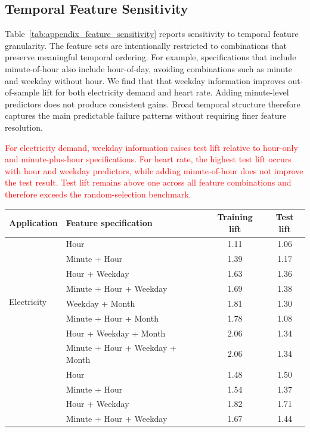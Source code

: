\documentclass[]{interact}
\newcommand{\matt}[1]{\textcolor{red}{#1}}
\newcommand{\spacingset}[1]{}
\theoremstyle{definition}
\begin{document}
\subsection{Temporal Feature Sensitivity}

Table~\ref{tab:appendix_feature_sensitivity} reports sensitivity to temporal feature granularity. The feature sets are intentionally restricted to combinations that preserve meaningful temporal ordering. For example, specifications that include minute-of-hour also include hour-of-day, avoiding combinations such as minute and weekday without hour. We find that that weekday information improves out-of-sample lift for both electricity demand and heart rate. Adding minute-level predictors does not produce consistent gains. Broad temporal structure therefore captures the main predictable failure patterns without requiring finer feature resolution.

\matt{For electricity demand, weekday information raises test lift relative to hour-only and minute-plus-hour specifications. For heart rate, the highest test lift occurs with hour and weekday predictors, while adding minute-of-hour does not improve the test result. Test lift remains above one across all feature combinations and therefore exceeds the random-selection benchmark.}

{\spacingset{1}
\begin{samepage}
\begin{center}
\label{tab:appendix_feature_sensitivity}
{\small
\renewcommand{\arraystretch}{1}
\begin{tabularx}{\textwidth}{@{}l>{\raggedright\arraybackslash}Xcc@{}}
\toprule
\textbf{Application} & \textbf{Feature specification} & \textbf{Training lift} & \textbf{Test lift} \\
\midrule
\multirow{8}{*}{Electricity} & Hour & 1.11 & 1.06 \\
 & Minute + Hour & 1.39 & 1.17 \\
 & Hour + Weekday & 1.63 & 1.36 \\
 & Minute + Hour + Weekday & 1.69 & 1.38 \\
 & Weekday + Month & 1.81 & 1.30 \\
 & Minute + Hour + Month & 1.78 & 1.08 \\
 & Hour + Weekday + Month & 2.06 & 1.34 \\
 & Minute + Hour + Weekday + Month & 2.06 & 1.34 \\
\addlinespace
\multirow{4}{*}{Heart rate} & Hour & 1.48 & 1.50 \\
 & Minute + Hour & 1.54 & 1.37 \\
 & Hour + Weekday & 1.82 & 1.71 \\
 & Minute + Hour + Weekday & 1.67 & 1.44 \\
\bottomrule
\end{tabularx}
}
\end{center}
\end{samepage}
}
\end{document}
